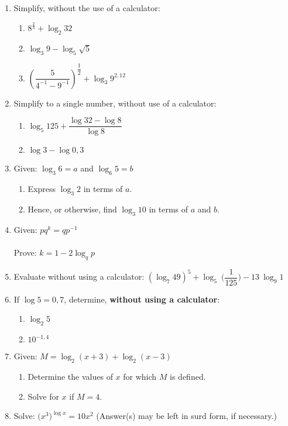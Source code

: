 {{\begin{eocexercises}{}
\begin{enumerate}
\item{Simplify, without the use of a calculator:
\begin{enumerate}
\item{$8^{\frac{2}{3}}+\log_2 32$}
\item{$\log_3 9 - \log_5 \sqrt{5}$}
\item{$\left(\dfrac{5}{4^{-1}-9^{-1}}\right)^{\dfrac{1}{2}}+\log_3 9^{2,12}$}
\end{enumerate}}
\item{Simplify to a single number, without use of a calculator:
\begin{enumerate}
\item{$\log_5 125 + \dfrac{\log 32-\log 8}{\log 8}$}
\item{$\log 3 - \log 0,3$}
\end{enumerate}}
\item{Given: \quad $\log_3 6 = a$ and $\log_6 5 = b$
\begin{enumerate}
\item{Express $\log_3 2$ in terms of $a$.}
\item{Hence, or otherwise, find $\log_3 10$ in terms of $a$ and $b$.}
\end{enumerate}}

\item{Given: \quad $pq^k = qp^{-1}$ \\ \\ Prove: \quad $k = 1 - 2\log_q p$}

\item{Evaluate without using a calculator: $(\log_{ 7} 49)^5 + \log_{ 5} \: \biggl(\dfrac{1}{125}\biggr) - 13\:\log_{ 9} 1$}

\item{If $\log 5 = 0,7$, determine, \textbf{without using a calculator}:
\begin{enumerate}
\item{$\log_2 5$}
\item{$10^{-1,4}$}
\end{enumerate}}

\item{Given: \qquad $M = \log_2 (x+3) + \log_2 (x-3)$
\begin{enumerate}
\item{Determine the values of $x$ for which $M$ is defined.}
\item{Solve for $x$ if $M = 4$.}
\end{enumerate}}

\item{Solve: \qquad $\biggl(x^3\biggr)^{\log x} = 10 x^2$ (Answer(s) may be left in surd form, if necessary.)}


\end{enumerate}
\end{eocexercises}}}

